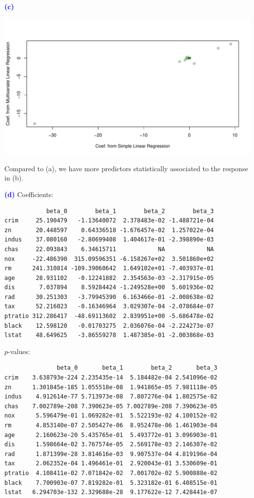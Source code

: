 \documentclass[a4paper,12pt]{article}
\newcommand{\qnum}[1]{\noindent\textcolor{blue}{\textbf{(#1)}}}
\begin{document}
\qnum{c}
\begin{center}
    \includegraphics[width=1\linewidth]{Images/Prob2-Ex15-c.pdf}
\end{center}

Compared to (a), we have more predictors statistically associated to the response in (b).
\bigskip







\qnum{d}
Coefficients:
\begin{verbatim}
            beta_0        beta_1        beta_2        beta_3
crim     25.190479   -1.13640072  2.378483e-02 -1.488721e-04
zn       20.448597    0.64336518 -1.676457e-02  1.257022e-04
indus    37.080160   -2.80699408  1.404617e-01 -2.398890e-03
chas     22.093843    6.34615711            NA            NA
nox     -22.486390  315.09596351 -6.158267e+02  3.501860e+02
rm      241.310814 -109.39060642  1.649102e+01 -7.403937e-01
age      28.931102   -0.12241882  2.354563e-03 -2.317915e-05
dis       7.037894    8.59284424 -1.249528e+00  5.601936e-02
rad      30.251303   -3.79945390  6.163466e-01 -2.008638e-02
tax      52.216023   -0.16346964  3.029307e-04 -2.078684e-07
ptratio 312.286417  -48.69113602  2.839951e+00 -5.686478e-02
black    12.598120   -0.01703275  2.036076e-04 -2.224273e-07
lstat    48.649625   -3.86559278  1.487385e-01 -2.003868e-03
\end{verbatim}

$p$-values:
\begin{verbatim}
               beta_0       beta_1        beta_2       beta_3
crim    3.638793e-224 2.235435e-14  5.184482e-04 2.541096e-02
zn      1.301845e-185 1.055518e-08  1.941865e-05 7.981118e-05
indus    4.912614e-77 5.713973e-08  7.807276e-04 1.802575e-02
chas    7.002789e-208 7.390623e-05 7.002789e-208 7.390623e-05
nox      5.596479e-01 1.069282e-01  5.522193e-02 4.100152e-02
rm       4.853140e-07 2.505427e-06  8.952478e-06 1.461903e-04
age      2.160623e-20 5.435765e-01  5.493772e-01 3.096903e-01
dis      1.598664e-02 3.767574e-05  2.569178e-03 2.146307e-02
rad      1.871399e-28 3.814616e-03  9.907537e-04 4.819196e-04
tax      2.062352e-04 1.496461e-01  2.920043e-01 3.530609e-01
ptratio  4.108411e-02 7.071842e-02  7.001702e-02 5.900888e-02
black    7.700903e-07 7.819282e-01  5.323182e-01 6.408515e-01
lstat   6.294703e-132 2.329688e-28  9.177622e-12 7.428441e-07
\end{verbatim}
\end{document}
